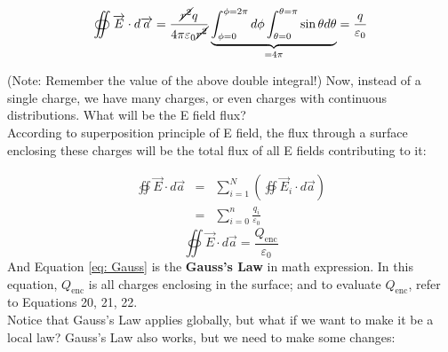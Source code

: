 \documentclass[12pt,a4paper,twoside]{article}
\begin{document}
    \[\oiint \overrightarrow{E}\cdot d\overrightarrow{a}=\frac{\cancel{r^2}q}{4\pi\varepsilon_0\cancel{r^2}}\underbrace{\int_{\phi=0}^{\phi=2\pi}d\phi\int_{\theta=0}^{\theta=\pi}\sin\theta d\theta}_{=4\pi}=\frac{q}{\varepsilon_0}\]
    
    (Note: Remember the value of the above double integral!)
    \newline
    \noindent Now, instead of a single charge, we have many charges, or even charges with continuous distributions. What will be the E field flux?\\
    \newline
    \noindent According to superposition principle of E field, the flux through a surface enclosing these charges will be the total flux of all E fields contributing to it:

        \begin{eqnarray*}
            \oiint \overrightarrow{E} \cdot d\overrightarrow{a} &=& \sum_{i=1}^{N}\left(\oiint \overrightarrow{E}_i \cdot d\overrightarrow{a}\right)  \\
            &=& \sum_{i=0}^{n}\frac{q_i}{\varepsilon_0}
        \end{eqnarray*}
        \begin{equation}
            \oiint \overrightarrow{E} \cdot d\overrightarrow{a}=\frac{Q_{\mathrm{enc}}}{\varepsilon_0}
            \label{eq: Gauss}
        \end{equation}
    And Equation \ref{eq: Gauss} is the \textbf{Gauss's Law} in math expression. In this equation, $Q_{\mathrm{enc}}$ is all charges enclosing in the surface; and to evaluate $Q_{\mathrm{enc}}$, refer to Equations 20, 21, 22.\\
    \newline
    \noindent Notice that Gauss's Law applies globally, but what if we want to make it be a local law? Gauss's Law also works, but we need to make some changes:
\end{document}
